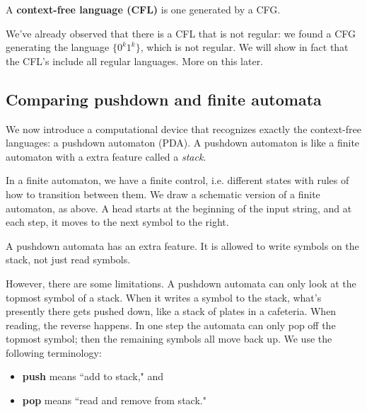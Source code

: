 \begin{df}
A \textbf{context-free language (CFL)} is one generated by a CFG.
\end{df}
We've already observed that there is a CFL that is not regular: we found a CFG generating the language $\{0^k1^k\}$, which is not regular. We will show in fact that the CFL's include all regular languages. More on this later.

\subsection{Comparing pushdown and finite automata}
We now introduce a computational device that recognizes exactly the context-free languages: a pushdown automaton (PDA).
A pushdown automaton is like a finite automaton with a extra feature called a {\it stack}.
%


In a finite automaton, we have a finite control, i.e. different states with rules of how to transition between them. We draw a schematic version of a finite automaton, as above. A head starts at the beginning of the input string, and at each step, it moves to the next symbol to the right.

A pushdown automata has an extra feature. It is allowed to write symbols on the stack, not just read symbols.


However, there are some limitations. A pushdown automata can only look at the topmost symbol of a stack. When it writes a symbol to the stack, what's presently there gets pushed down, like a stack of plates in a cafeteria. When reading, the reverse happens. In one step the automata can only pop off the topmost symbol; then the remaining symbols all move back up.
We use the following terminology:
\begin{itemize}
\item
\textbf{push} means ``add to stack," and
\item
\textbf{pop} means ``read and remove from stack."
\end{itemize}


